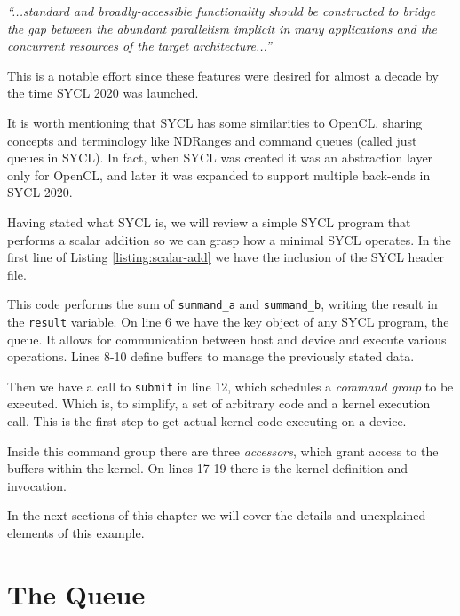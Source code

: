 \vspace{3mm}
\textit{``...standard and broadly-accessible functionality should be constructed to bridge the gap between the abundant parallelism implicit in many applications and the concurrent resources of the target architecture...''} 
\vspace{3mm}

This is a notable effort since these features were desired for almost a decade by the time SYCL 2020 was launched.

It is worth mentioning that SYCL has some similarities to OpenCL, sharing concepts and terminology like NDRanges and command queues (called just queues in SYCL).
In fact, when SYCL was created it was an abstraction layer only for OpenCL, and later it was expanded to support multiple back-ends in SYCL 2020.

Having stated what SYCL is, we will review a simple SYCL program that performs a scalar addition so we can grasp how a minimal SYCL operates.
In the first line of Listing \ref{listing:scalar-add} we have the inclusion of the SYCL header file.



This code performs the sum of \texttt{summand\_a} and \texttt{summand\_b}, writing the result in the \texttt{result} variable.
On line 6 we have the key object of any SYCL program, the queue.
It allows for communication between host and device and execute various operations.
Lines 8-10 define buffers to manage the previously stated data.

Then we have a call to \texttt{submit} in line 12, which schedules a \textit{command group} to be executed.
Which is, to simplify, a set of arbitrary code and a kernel execution call.
This is the first step to get actual kernel code executing on a device.

Inside this command group there are three \textit{accessors}, which grant access to the buffers within the kernel.
On lines 17-19 there is the kernel definition and invocation.

In the next sections of this chapter we will cover the details and unexplained elements of this example.

\section{The Queue}

